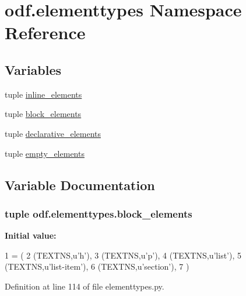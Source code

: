 \hypertarget{namespaceodf_1_1elementtypes}{\section{odf.\+elementtypes Namespace Reference}
\label{namespaceodf_1_1elementtypes}
}
\subsection*{Variables}
\begin{DoxyCompactItemize}
\item 
tuple \hyperlink{namespaceodf_1_1elementtypes_af6af3ee74d3bbcd994b62e093d66efce}{inline\+\_\+elements}
\item 
tuple \hyperlink{namespaceodf_1_1elementtypes_a93bef01e769e000343dd44fd7f0c6857}{block\+\_\+elements}
\item 
tuple \hyperlink{namespaceodf_1_1elementtypes_a0f3fdba85272e773adbe3e184125310f}{declarative\+\_\+elements}
\item 
tuple \hyperlink{namespaceodf_1_1elementtypes_ad5a29e22e6077343a8348bc3d1b13068}{empty\+\_\+elements}
\end{DoxyCompactItemize}


\subsection{Variable Documentation}
\hypertarget{namespaceodf_1_1elementtypes_a93bef01e769e000343dd44fd7f0c6857}{
\subsubsection[{block\+\_\+elements}]{\setlength{\rightskip}{0pt plus 5cm}tuple odf.\+elementtypes.\+block\+\_\+elements}}\label{namespaceodf_1_1elementtypes_a93bef01e769e000343dd44fd7f0c6857}
{\bfseries Initial value\+:}
\begin{DoxyCode}
1 = (
2     (TEXTNS,\textcolor{stringliteral}{u'h'}),
3     (TEXTNS,\textcolor{stringliteral}{u'p'}),
4     (TEXTNS,\textcolor{stringliteral}{u'list'}),
5     (TEXTNS,\textcolor{stringliteral}{u'list-item'}),
6     (TEXTNS,\textcolor{stringliteral}{u'section'}),
7 )
\end{DoxyCode}


Definition at line 114 of file elementtypes.\+py.

